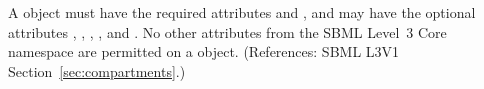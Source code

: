 A \Compartment object must have the required attributes  and
, and may have the optional attributes ,
, , ,  and
.  No other attributes from the SBML Level~3 Core namespace
are permitted on a \Compartment object.  (References: SBML L3V1
Section~\ref{sec:compartments}.)
